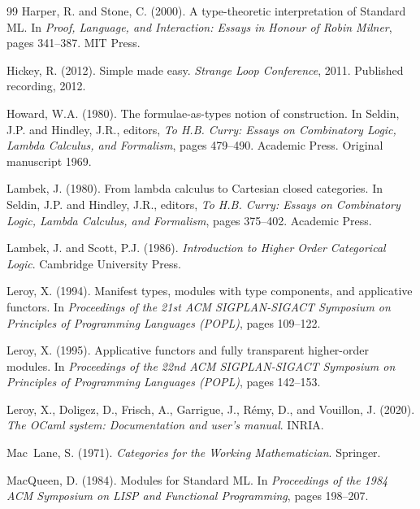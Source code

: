 \documentclass[11pt,a4paper]{article}
\begin{document}
\begin{thebibliography}{99}
Harper, R. and Stone, C. (2000).
\newblock A type-theoretic interpretation of Standard ML.
\newblock In \emph{Proof, Language, and Interaction: Essays in Honour of Robin Milner}, pages 341--387. MIT Press.

Hickey, R. (2012).
\newblock Simple made easy.
\newblock \emph{Strange Loop Conference}, 2011. Published recording, 2012.

Howard, W.A. (1980).
\newblock The formulae-as-types notion of construction.
\newblock In Seldin, J.P. and Hindley, J.R., editors, \emph{To H.B. Curry: Essays on Combinatory Logic, Lambda Calculus, and Formalism}, pages 479--490. Academic Press. Original manuscript 1969.

Lambek, J. (1980).
\newblock From lambda calculus to Cartesian closed categories.
\newblock In Seldin, J.P. and Hindley, J.R., editors, \emph{To H.B. Curry: Essays on Combinatory Logic, Lambda Calculus, and Formalism}, pages 375--402. Academic Press.

Lambek, J. and Scott, P.J. (1986).
\newblock \emph{Introduction to Higher Order Categorical Logic}.
\newblock Cambridge University Press.

Leroy, X. (1994).
\newblock Manifest types, modules with type components, and applicative functors.
\newblock In \emph{Proceedings of the 21st ACM SIGPLAN-SIGACT Symposium on Principles of Programming Languages (POPL)}, pages 109--122.

Leroy, X. (1995).
\newblock Applicative functors and fully transparent higher-order modules.
\newblock In \emph{Proceedings of the 22nd ACM SIGPLAN-SIGACT Symposium on Principles of Programming Languages (POPL)}, pages 142--153.

Leroy, X., Doligez, D., Frisch, A., Garrigue, J., R\'{e}my, D., and Vouillon, J. (2020).
\newblock \emph{The OCaml system: Documentation and user's manual}.
\newblock INRIA.

Mac~Lane, S. (1971).
\newblock \emph{Categories for the Working Mathematician}.
\newblock Springer.

MacQueen, D. (1984).
\newblock Modules for Standard ML.
\newblock In \emph{Proceedings of the 1984 ACM Symposium on LISP and Functional Programming}, pages 198--207.


\end{thebibliography}
\end{document}
